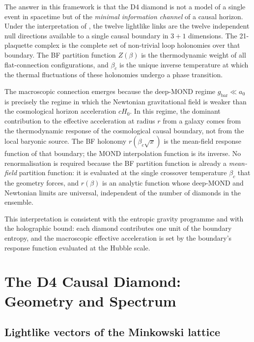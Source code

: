 \documentclass[12pt,a4paper]{article}
\theoremstyle{plain}
\theoremstyle{definition}
\newcommand{\betac}{\beta_c}
\begin{document}
The answer in this framework is that the D4 diamond is not a model of
a single event in spacetime but of the \emph{minimal information channel}
of a causal horizon.  Under the interpretation of \cite{Schmitt2026a},
the twelve lightlike links are the twelve independent null directions
available to a single causal boundary in $3+1$ dimensions.  The
21-plaquette complex is the complete set of non-trivial loop holonomies
over that boundary.  The BF partition function $Z(\beta)$ is the
thermodynamic weight of all flat-connection configurations, and $\betac$
is the unique inverse temperature at which the thermal fluctuations of
these holonomies undergo a phase transition.

The macroscopic connection emerges because the deep-MOND regime
$g_{\mathrm{bar}} \ll a_0$ is precisely the regime in which the
Newtonian gravitational field is weaker than the cosmological horizon
acceleration $cH_0$.  In this regime, the dominant contribution to
the effective acceleration at radius $r$ from a galaxy comes from the
thermodynamic response of the cosmological causal boundary, not from
the local baryonic source.  The BF holonomy $r(\betac\sqrt{x})$ is
the mean-field response function of that boundary; the MOND
interpolation function is its inverse.  No renormalisation is required
because the BF partition function is already a \emph{mean-field}
partition function: it is evaluated at the single crossover temperature
$\betac$ that the geometry forces, and $r(\beta)$ is an analytic
function whose deep-MOND and Newtonian limits are universal,
independent of the number of diamonds in the ensemble.

This interpretation is consistent with the entropic gravity programme
\cite{Verlinde2011} and with the holographic bound: each diamond
contributes one unit of the boundary entropy, and the macroscopic
effective acceleration is set by the boundary's response function
evaluated at the Hubble scale.

\vspace{6pt}

\section{The D4 Causal Diamond: Geometry and Spectrum}
\label{sec:geometry}

\subsection{Lightlike vectors of the Minkowski lattice}
\end{document}

